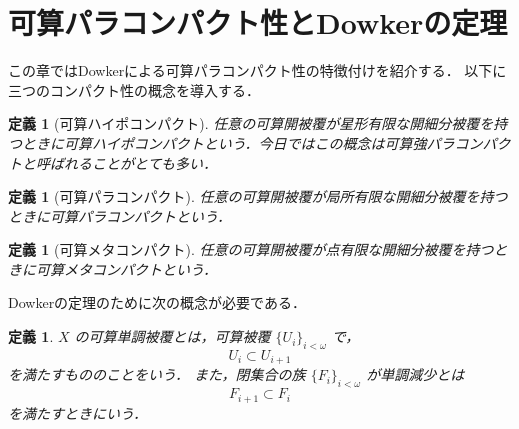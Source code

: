 \documentclass[leqno, 12pt]{ltjsarticle}
\newtheorem{df}[thm]{定義}
\begin{document}
\section{可算パラコンパクト性とDowkerの定理}
この章ではDowkerによる可算パラコンパクト性の特徴付けを紹介する．
以下に三つのコンパクト性の概念を導入する．
\begin{df}[可算ハイポコンパクト]
任意の可算開被覆が星形有限な開細分被覆を持つときに可算ハイポコンパクトという．今日ではこの概念は可算強パラコンパクトと呼ばれることがとても多い．
\end{df}
\begin{df}[可算パラコンパクト]
任意の可算開被覆が局所有限な開細分被覆を持つときに可算パラコンパクトという．
\end{df}

\begin{df}[可算メタコンパクト]
任意の可算開被覆が点有限な開細分被覆を持つときに可算メタコンパクトという．
\end{df}

Dowkerの定理のために次の概念が必要である．
\begin{df}
$X$
の可算単調被覆とは，可算被覆
$\{U_{i}\}_{i<\omega}$
で，
\[
U_{i}\subset U_{i+1}
\]
を満たすもののことをいう．
また，閉集合の族
$\{F_{i}\}_{i<\omega}$
が単調減少とは
\[
F_{i+1}\subset F_{i}
\]
を満たすときにいう．
\end{df}
\end{document}
